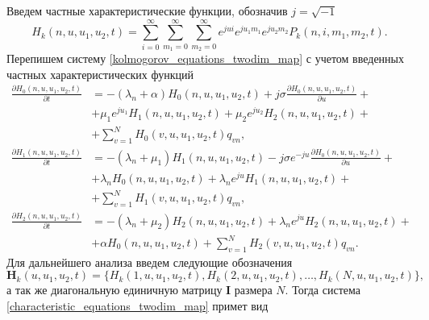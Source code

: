 Введем частные характеристические функции, обозначив $j=\sqrt{-1}$
\begin{equation*}
	H_{k}(n,u,u_{1},u_{2},t) = \sum_{i=0}^{\infty}
	\sum_{m_{1}=0}^{\infty}
	\sum_{m_{2}=0}^{\infty}  
	e^{jui}e^{ju_{1}m_{1}}e^{ju_{2}m_{2}} P_{k}(n,i,m_{1},m_{2},t).
\end{equation*}
Перепишем систему \eqref{kolmogorov_equations_twodim_map} с учетом введенных частных характеристических функций
\begin{equation} \label{characteristic_equations_twodim_map}
	\begin{split}
		\frac{{\partial H_{0}(n,u,u_{1},u_{2},t)}}{{\partial t}} &= -(\lambda_{n} + \alpha)H_{0}(n,u,u_{1},u_{2},t) + j\sigma
		\frac{{\partial H_{0}(n,u,u_{1},u_{2},t)}}{{\partial u}} +\\  &+ \mu_{1} e^{ju_{1}}H_{1}(n,u,u_{1},u_{2},t) + \mu_{2}e^{ju_{2}}H_{2}(n,u,u_{1},u_{2},t) +\\  &+ \sum_{v=1}^{N}H_{0}(v,u,u_{1},u_{2},t)q_{vn} ,
		\\
		\frac{{\partial H_{1}(n,u,u_{1},u_{2},t)}}{{\partial t}} &= -(\lambda_{n} + \mu_{1})H_{1}(n,u,u_{1},u_{2},t) - j\sigma e^{-ju}
		\frac{{\partial H_{0}(n,u,u_{1},u_{2},t)}}{{\partial u}} +\\  &+ \lambda_{n} H_{0}(n,u,u_{1},u_{2},t) + \lambda_{n} e^{ju}H_{1}(n,u,u_{1},u_{2},t) +\\  &+ \sum_{v=1}^{N}H_{1}(v,u,u_{1},u_{2},t)q_{vn} ,
		\\
		\frac{{\partial H_{2}(n,u,u_{1},u_{2},t)}}{{\partial t}} &= -(\lambda_{n} + \mu_{2})H_{2}(n,u,u_{1},u_{2},t)  + \lambda_{n} e^{ju}H_{2}(n,u,u_{1},u_{2},t) +\\  &+ \alpha H_{0}(n,u,u_{1},u_{2},t) + \sum_{v=1}^{N}H_{2}(v,u,u_{1},u_{2},t)q_{vn}.
	\end{split}
\end{equation}  
Для дальнейшего анализа введем следующие обозначения
\begin{equation*}	
\boldsymbol{H}_{k}(u,u_{1},u_{2},t) = \{H_{k}(1,u,u_{1},u_{2},t),H_{k}(2,u,u_{1},u_{2},t),\dots,H_{k}(N,u,u_{1},u_{2},t)\},
\end{equation*}
а так же диагональную единичную матрицу $\boldsymbol{I}$ размера $N$.
Тогда система \eqref{characteristic_equations_twodim_map} примет вид
